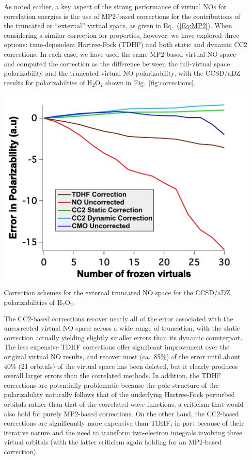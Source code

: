 As noted earlier, a key aspect of the strong performance of virtual NOs for
correlation energies is the use of MP2-based corrections for the contributions
of the truncated or ``external'' virtual space, as given in
Eq.~(\ref{Eq:MP2}).  When considering a similar correction for properties,
however, we have explored three options: time-dependent Hartree-Fock (TDHF)
and both static and dynamic CC2\cite{Christiansen95:CC2} corrections.  In each
case, we have used the same MP2-based virtual NO space and computed the
correction as the difference between the full-virtual space polarizability and
the truncated virtual-NO polarizability, with the CCSD/aDZ results for
polarizabilties of H$_2$O$_2$ shown in Fig.~\ref{fig:corrections}.
\begin{MyFigure}[h!]
\centering
\includegraphics[width=0.6\linewidth,natwidth=610,natheight=642]{figures_fvno/correctn.pdf}
\caption{{\footnotesize Correction schemes for the external truncated
NO space for the CCSD/aDZ polarizabilities of H$_2$O$_2$.}}
\label{fig:corrections}
\end{MyFigure}
The CC2-based corrections recover nearly all of the error associated with the
uncorrected virtual NO space across a wide range of truncation, with the
static correction actually yielding slightly smaller errors than its dynamic
counterpart.  The less expensive TDHF corrections offer significant
improvement over the original virtual NO results, and recover most (ca.\ 85\%)
of the error until about 40\% (21 orbitals) of the virtual space has been
deleted, but it clearly produces overall larger errors than the correlated
methods.  In addition, the TDHF corrections are potentially problematic
because the pole structure of the polarizability naturally follows that of the
underlying Hartree-Fock perturbed orbitals rather than that of the correlated
wave functions,\cite{Rice91,Hattig95,Aiga96} a criticism that would also hold
for purely MP2-based corrections.  On the other hand, the CC2-based
corrections are significantly more expensive than TDHF, in part because of
their iterative nature and the
need to transform two-electron integrals involving three virtual orbitals
(with the latter criticism again holding for an MP2-based correction).

